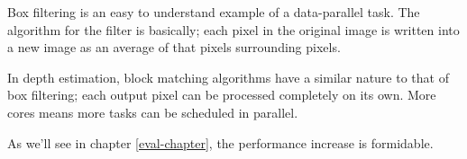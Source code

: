 Box filtering is an easy to understand example of a data-parallel
task. The algorithm for the filter is basically; each pixel in the
original image is written into a new image as an average of that
pixels surrounding pixels.

In depth estimation, block matching algorithms have a similar nature
to that of box filtering; each output pixel can be processed
completely on its own. More cores means more tasks can be scheduled in
parallel.

As we'll see in chapter \ref{eval-chapter}, the performance increase
is formidable.

